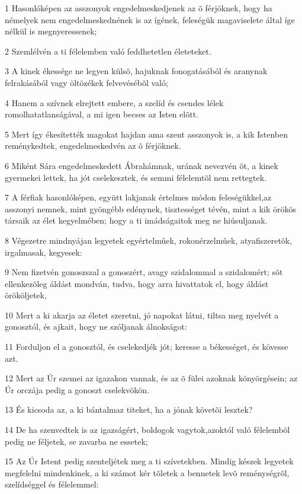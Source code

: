 \par 1 Hasonlóképen az asszonyok engedelmeskedjenek az õ férjöknek, hogy ha némelyek nem engedelmeskednének is az ígének, feleségük magaviselete által íge nélkül is megnyeressenek;
\par 2 Szemlélvén a ti félelemben való feddhetetlen életeteket.
\par 3 A kinek ékessége ne legyen külsõ, hajuknak fonogatásából és aranynak felrakásából vagy öltözékek felvevésébõl való;
\par 4 Hanem a szívnek elrejtett embere, a szelíd és csendes lélek romolhatatlanságával, a mi igen becses az Isten elõtt.
\par 5 Mert így ékesítették magokat hajdan ama szent asszonyok is, a kik Istenben reménykedtek, engedelmeskedvén az õ férjöknek.
\par 6 Miként Sára engedelmeskedett Ábrahámnak, urának nevezvén õt, a kinek gyermekei lettek, ha jót cselekesztek, és semmi félelemtõl nem rettegtek.
\par 7 A férfiak hasonlóképen, együtt lakjanak értelmes módon feleségükkel,az asszonyi nemnek, mint gyöngébb edénynek, tisztességet tévén, mint a kik örökös társaik az élet kegyelmében; hogy a ti imádságaitok meg ne hiúsuljanak.
\par 8 Végezetre mindnyájan legyetek egyértelmûek, rokonérzelmûek, atyafiszeretõk, irgalmasak, kegyesek:
\par 9 Nem fizetvén gonoszszal a gonoszért, avagy szidalommal a szidalomért; sõt ellenkezõleg áldást mondván, tudva, hogy arra hivattatok el, hogy áldást örököljetek,
\par 10 Mert a ki akarja az életet szeretni, jó napokat látni, tiltsa meg nyelvét a gonosztól, és ajkait, hogy ne szóljanak álnokságot:
\par 11 Forduljon el a gonosztól, és cselekedjék jót; keresse a békességet, és kövesse azt.
\par 12 Mert az Úr szemei az igazakon vannak, és az õ fülei azoknak könyörgésein; az Úr orczája pedig a gonoszt cselekvõkön.
\par 13 És kicsoda az, a ki bántalmaz titeket, ha a jónak követõi lesztek?
\par 14 De ha szenvedtek is az igazságért, boldogok vagytok,azoktól való félelembõl pedig ne féljetek, se zavarba ne essetek;
\par 15 Az Úr Istent pedig szenteljétek meg a ti szívetekben. Mindig készek legyetek megfelelni mindenkinek, a ki számot kér tõletek a bennetek levõ reménységrõl, szelídséggel és félelemmel:
